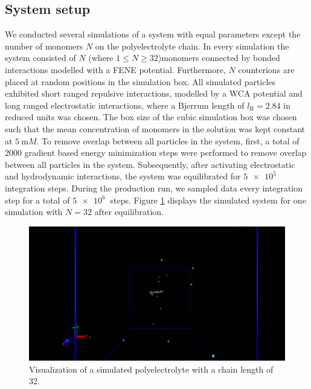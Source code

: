 \subsection{System setup}
We conducted several simulations of a system with equal parameters except the number of monomers $N$ on the polyelectrolyte chain. In every simulation the system consisted of $N$ (where $1\le N \ge 32$)monomers connected by bonded interactions modelled with a FENE potential. Furthermore, $N$ counterions are placed at random positions in the simulation box. All simulated particles exhibited short ranged repulsive interactions, modelled by a WCA potential and long ranged electrostatic interactions, where a Bjerrum length of $l_\text{B} = 2.84$ in reduced units was chosen. The box size of the cubic simulation box was chosen such that the mean concentration of monomers in the solution was kept constant at $\SI{5}{\milli M}$. To remove overlap between all particles in the system, first, a total of $2000$ gradient based energy minimization steps were performed to remove overlap between all particles in the system. Subsequently, after activating electrostatic and hydrodynamic interactions, the system was equilibrated for $\SI{5e5}{}$ integration steps. During the production run, we sampled data every integration step for a total of $\SI{5e6}{}$ steps. Figure \ref{fig:vmd} displays the simulated system for one simulation with $N=32$ after equilibration.
\begin{figure}[H]
	\centering
	\includegraphics[width=\columnwidth]{Analysis_1/VMD_visualization}
	\captionsetup{width=\columnwidth}
	\caption{Visualization of a simulated polyelectrolyte with a chain length of 32.}
	\label{fig:vmd}
\end{figure}